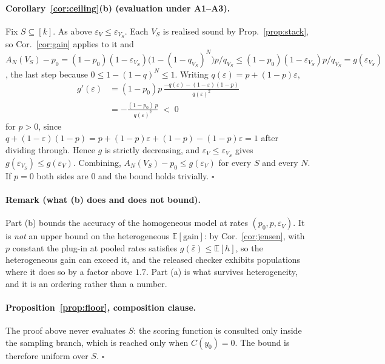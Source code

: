 \documentclass[11pt]{article}
\begin{document}
\paragraph{Corollary~\ref{cor:ceiling}(b) (evaluation under A1--A3).}
Fix $S\subseteq[k]$. As above $\varepsilon_V\le\varepsilon_{V_S}$. Each $V_S$ is
realised sound by Prop.~\ref{prop:stack}, so Cor.~\ref{cor:gain} applies to it and
$A_N(V_S)-p_0=(1-p_0)(1-\varepsilon_{V_S})\bigl(1-(1-q_{V_S})^N\bigr)p/q_{V_S}
\le(1-p_0)(1-\varepsilon_{V_S})p/q_{V_S}=g(\varepsilon_{V_S})$, the last step
because $0\le 1-(1-q)^N\le 1$. Writing $q(\varepsilon)=p+(1-p)\varepsilon$,
\[
\begin{aligned}
g'(\varepsilon)&=(1-p_0)p\,\frac{-q(\varepsilon)-(1-\varepsilon)(1-p)}{q(\varepsilon)^2}\\[2pt]
&=-\frac{(1-p_0)\,p}{q(\varepsilon)^2}\;<\;0
\end{aligned}
\]
for $p>0$, since $q+(1-\varepsilon)(1-p)=p+(1-p)\varepsilon+(1-p)-(1-p)\varepsilon=1$
after dividing through. Hence $g$ is strictly decreasing, and
$\varepsilon_V\le\varepsilon_{V_S}$ gives $g(\varepsilon_{V_S})\le g(\varepsilon_V)$.
Combining, $A_N(V_S)-p_0\le g(\varepsilon_V)$ for every $S$ and every $N$. If
$p=0$ both sides are $0$ and the bound holds trivially. \hfill$\square$

\paragraph{Remark (what (b) does and does not bound).}
Part (b) bounds the accuracy of the homogeneous model at rates
$(p_0,p,\varepsilon_V)$. It is \emph{not} an upper bound on the heterogeneous
$\mathbb{E}[\text{gain}]$: by Cor.~\ref{cor:jensen}, with $p$ constant the
plug-in at pooled rates satisfies $g(\bar\varepsilon)\le\mathbb{E}[h]$, so the
heterogeneous gain can exceed it, and the released checker exhibits populations
where it does so by a factor above $1.7$. Part (a) is what survives
heterogeneity, and it is an ordering rather than a number.

\paragraph{Proposition~\ref{prop:floor}, composition clause.}
The proof above never evaluates $S$: the scoring function is consulted only inside the sampling branch, which is reached only when $C(y_0)=0$. The bound is therefore uniform over $S$. \hfill$\square$
\end{document}
